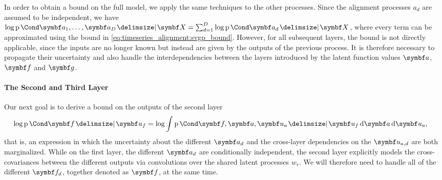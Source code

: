 In order to obtain a bound on the full model, we apply the same techniques to the other processes.
Since the alignment processes $a_d$ are assumed to be independent, we have $\log \Prob{\rv{a_1}, \dots, \rv{a_D} \given \mat{X}} = \sum_{d=1}^D \log \Prob{\rv{a_d} \given \mat{X}}$, where every term can be approximated using the bound in \cref{eq:timeseries_alignment:svgp_bound}.
However, for all subsequent layers, the bound is not directly applicable, since the inputs are no longer known but instead are given by the outputs of the previous process.
It is therefore necessary to propagate their uncertainty and also handle the interdependencies between the layers introduced by the latent function values $\rv{a}$, $\rv{f}$ and $\rv{g}$.

\paragraph{The Second and Third Layer}
\label{sub:timeseries_alignment:other_layers}
Our next goal is to derive a bound on the outputs of the second layer
\begin{align}
\begin{split}
    \log \Prob{\rv{f} \given \mat{u_f}} &= \log \int \Prob{\rv{f}, \rv{a}, \mat{u_a} \given \mat{u_f}} \diff \rv{a} \diff \mat{u_a},
\end{split}
\end{align}
that is, an expression in which the uncertainty about the different $\rv{a_d}$  and the cross-layer dependencies on the $\rv{u_{a, d}}$ are both marginalized.
While on the first layer, the different $\rv{a_d}$ are conditionally independent, the second layer explicitly models the cross-covariances between the different outputs via convolutions over the shared latent processes $w_r$.
We will therefore need to handle all of the different $\rv{f_d}$, together denoted as $\rv{f}$, at the same time.

